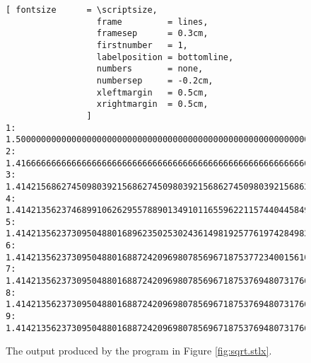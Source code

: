\begin{figure}[!ht]
\centering
\begin{Verbatim}[ fontsize      = \scriptsize,
                  frame         = lines, 
                  framesep      = 0.3cm, 
                  firstnumber   = 1,
                  labelposition = bottomline,
                  numbers       = none,
                  numbersep     = -0.2cm,
                  xleftmargin   = 0.5cm,
                  xrightmargin  = 0.5cm,
                ]
1: 1.5000000000000000000000000000000000000000000000000000000000000000000000000000000000000000000000000000
2: 1.4166666666666666666666666666666666666666666666666666666666666666666666666666666666666666666666666666
3: 1.4142156862745098039215686274509803921568627450980392156862745098039215686274509803921568627450980392
4: 1.4142135623746899106262955788901349101165596221157440445849050192000543718353892683589900431576443402
5: 1.4142135623730950488016896235025302436149819257761974284982894986231958242289236217849418367358303565
6: 1.4142135623730950488016887242096980785696718753772340015610131331132652556303399785317871612507104752
7: 1.4142135623730950488016887242096980785696718753769480731766797379907324784621070388503875343276416016
8: 1.4142135623730950488016887242096980785696718753769480731766797379907324784621070388503875343276415727
9: 1.4142135623730950488016887242096980785696718753769480731766797379907324784621070388503875343276415727
\end{Verbatim}
\vspace*{-0.3cm}
\caption{The output produced by the program in Figure \ref{fig:sqrt.stlx}.}
\label{fig:sqrt-output}
\end{figure}


